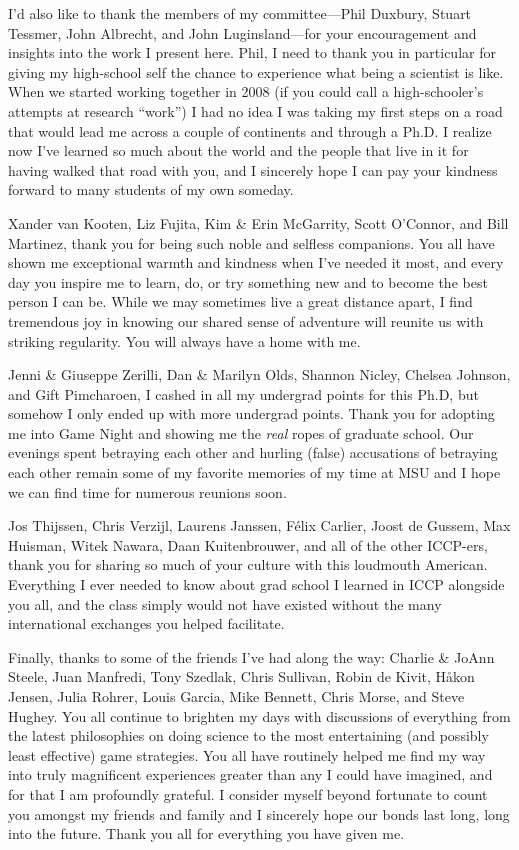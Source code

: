 \documentclass[mixedtoc]{msu-thesis-custom}
\begin{document}
I'd also like to thank the members of my committee---Phil Duxbury, Stuart
Tessmer, John Albrecht, and John Luginsland---for your encouragement and
insights into the work I present here. Phil, I need to thank you in particular
for giving my high-school self the chance to experience what being a scientist
is like. When we started working together in 2008 (if you could call a
high-schooler's attempts at research ``work'') I had no idea I was taking my
first steps on a road that would lead me across a couple of continents and
through a Ph.D. I realize now I've learned so much about the world and the
people that live in it for having walked that road with you, and I sincerely
hope I can pay your kindness forward to many students of my own someday.

Xander van Kooten, Liz Fujita, Kim \& Erin McGarrity, Scott O'Connor, and Bill
Martinez, thank you for being such noble and selfless companions. You all have
shown me exceptional warmth and kindness when I've needed it most, and every
day you inspire me to learn, do, or try something new and to become the best
person I can be. While we may sometimes live a great distance apart,
I find tremendous joy in knowing our shared sense of adventure will reunite us
with striking regularity. You will always have a home with me.

Jenni \& Giuseppe Zerilli, Dan \& Marilyn Olds, Shannon Nicley, Chelsea
Johnson, and Gift Pimcharoen, I cashed in all my undergrad points for this
Ph.D, but somehow I only ended up with more undergrad points. Thank you for
adopting me into Game Night and showing me the \emph{real} ropes of graduate
school. Our evenings spent betraying each other and hurling (false) accusations
of betraying each other remain some of my favorite memories of my time at MSU
and I hope we can find time for numerous reunions soon.

Jos Thijssen, Chris Verzijl, Laurens Janssen, F\'elix Carlier, Joost de Gussem,
Max Huisman, Witek Nawara, Daan Kuitenbrouwer, and all of the other ICCP-ers,
thank you for sharing so much of your culture with this loudmouth American.
Everything I ever needed to know about grad school I learned in ICCP alongside
you all, and the class simply would not have existed without the many 
international exchanges you helped facilitate.

Finally, thanks to some of the friends I've had along the way: Charlie \& JoAnn
Steele, Juan Manfredi, Tony Szedlak, Chris Sullivan, Robin de Kivit, H\aa kon
Jensen, Julia Rohrer, Louis Garcia, Mike Bennett, Chris Morse, and Steve
Hughey. You all continue to brighten my days with discussions of everything
from the latest philosophies on doing science to the most entertaining (and
possibly least effective) game strategies. 
\newpage
You all have routinely helped me find my way into truly magnificent experiences
greater than any I could have imagined, and for that I am profoundly grateful. I
consider myself beyond fortunate to count you amongst my friends and family and
I sincerely hope our bonds last long, long into the future. Thank you all for
everything you have given me.
\end{document}
